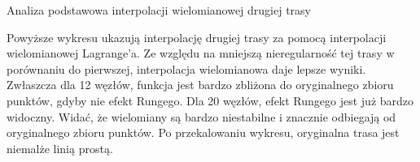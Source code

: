 \documentclass{article}
\begin{document}
\begin{section}{Analiza podstawowa interpolacji wielomianowej drugiej trasy}
\begin{figure}[H]
  \end{figure}
  \begin{figure}[H]
    \centering
  \end{figure}

  Powyższe wykresu ukazują interpolację drugiej trasy za pomocą interpolacji wielomianowej Lagrange'a.
  Ze względu na mniejszą nieregularność tej trasy w porównaniu do pierwszej, interpolacja wielomianowa daje lepsze wyniki.
  Zwłaszcza dla 12 węzłów, funkcja jest bardzo zbliżona do oryginalnego zbioru punktów, gdyby nie efekt Rungego.
  Dla 20 węzłów, efekt Rungego jest już bardzo widoczny. Widać, że wielomiany są bardzo niestabilne i znacznie odbiegają
  od oryginalnego zbioru punktów. Po przekalowaniu wykresu, oryginalna trasa jest niemalże linią prostą.
\end{section}
\end{document}
